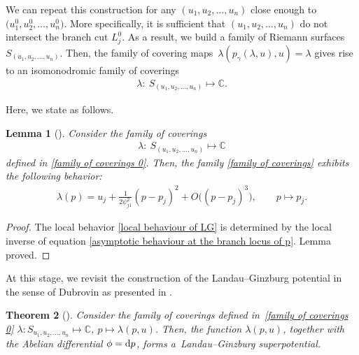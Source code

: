 \documentclass[11pt]{article}
\numberwithin{equation}{section}
\numberwithin{equation}{section}
\newtheorem{Theorem}{Theorem}[section]
\newtheorem{Lemma}[Theorem]{Lemma}
\begin{document}
 We can repeat this construction for any $(u_1,u_2,\dots,u_n)$ close enough to $\bigl(u_1^0,u_2^0,\dots,u_n^0\bigr)$. More specifically, it is sufficient that $(u_1,u_2,\dots,u_n)$ do not intersect the branch cut $L_j^0$. As a result, we build a family of Riemann surfaces $S_{(u_1,u_2,\dots,u_n)}$. Then, the family of covering maps~${
\lambda(p_{\gamma}(\lambda,u),u)=\lambda}
$
gives rise to an isomonodromic family of coverings
\begin{gather}\label{family of coverings 0}
\lambda \colon\ S_{(u_1,u_2,\dots,u_n)}\mapsto \mathbb{C}.
\end{gather}

Here, we state \cite[Proposition I.1]{B.Dubrovin2} as follows.

\begin{Lemma}[{\cite{B.Dubrovin2}}]\label{main constructive LG lemma}
Consider the family of coverings
\begin{gather}\label{family of coverings}
\lambda \colon\ S_{(u_1,u_2,\dots,u_n)}\mapsto \mathbb{C}
\end{gather}
defined in \eqref{family of coverings 0}. Then, the family \eqref{family of coverings} exhibits the following behavior:
\begin{gather}\label{local behaviour of LG}
\lambda(p)=u_j+ \frac{1}{2\psi^2_{j1}}( p-p_j)^2+O\bigl(( p-p_j)^3\bigr), \qquad p\mapsto p_j.
\end{gather}
\end{Lemma}

\begin{proof}
The local behavior \eqref{local behaviour of LG} is determined by the local inverse of equation \eqref{asymptotic behaviour at the branch locus of p}. Lemma proved.
\end{proof}

At this stage, we revisit the construction of the Landau--Ginzburg potential in the sense of Dubrovin as presented in \cite[Theorem~5.3]{B.Dubrovin3}.

\begin{Theorem}[{\cite{B.Dubrovin3}}]\label{Dubrovin superpotential theorem}
Consider the family of coverings defined in~\eqref{family of coverings 0}
$
\lambda \colon S_{u_1,u_2,\dots,u_n}\mapsto \mathbb{C}$, $ p\mapsto \lambda(p,u)$.
Then, the function $\lambda(p,u)$, together with the Abelian differential $\phi={\rm d}p$, forms a~Landau--Ginzburg superpotential.
\end{Theorem}
\end{document}
